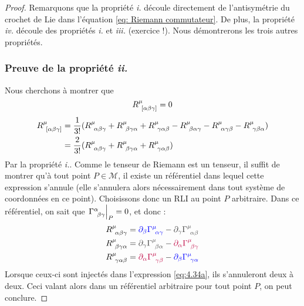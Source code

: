 \begin{proof}
    Remarquons que la propriété \emph{i.} découle directement de l'antisymétrie du crochet de Lie dans l'équation \ref{eq: Riemann commutateur}. De plus, la propriété \emph{iv.} découle des propriétés \emph{i.} et \emph{iii.} (exercice !). Nous démontrerons les trois autres propriétés.
    \subsubsection{Preuve de la propriété \emph{ii.}}
        Nous cherchons à montrer que 
        \begin{equation*}
            R\indices{^{\mu}_{\![\alpha \beta \gamma]}} = 0
        \end{equation*}
        \begin{align}
            R\indices{^{\mu}_{\![\alpha \beta \gamma]}} &= \frac{1}{3!}(R\indices{^{\mu}_{\!\alpha \beta \gamma}} + R\indices{^{\mu}_{\!\beta \gamma \alpha }} + R\indices{^{\mu}_{\!\gamma \alpha \beta}} - R\indices{^{\mu}_{\!\beta \alpha \gamma }} - R\indices{^{\mu}_{\!\alpha \gamma \beta} }- R\indices{^{\mu}_{\! \gamma \beta \alpha}})\\
            \label{eq:4.34a}
            &= \frac{2}{3!}(R\indices{^{\mu}_{\!\alpha \beta \gamma}} + R\indices{^{\mu}_{\!\beta \gamma \alpha}} + R\indices{^{\mu}_{\!\gamma \alpha \beta}})
        \end{align}
        Par la propriété \emph{i.}. Comme le tenseur de Riemann est un tenseur, il suffit de montrer qu'à tout point $P\in \mathcal{M}$, il existe un référentiel dans lequel cette expression s'annule (elle s'annulera alors nécessairement dans tout système de coordonnées en ce point). Choisissons donc un RLI au point $P$ arbitraire. Dans ce référentiel, on sait que $\atP{\Gamma\indices{^{\alpha}_{\!\beta \gamma}}} =0$, et donc :
        \begin{align}
        \nonumber
            &R\indices{^{\mu}_{\!\alpha \beta \gamma}}= \textcolor{blue}{\partial_{\beta}\Gamma\indices{^{\mu}_{\!\alpha \gamma}}} - \textcolor{darkgray}{\partial_{\gamma}\Gamma\indices{^{\mu}_{\!\alpha \beta}}}\\
            &R\indices{^{\mu}_{\!\beta \gamma \alpha}}= \textcolor{darkgray}{\partial_{\gamma}\Gamma\indices{^{\mu}_{\!\beta \alpha }}} - \textcolor{purple}{\partial_{\alpha}\Gamma\indices{^{\mu}_{\!\beta \gamma}}}\\
            \nonumber
            &R\indices{^{\mu}_{\!\gamma \alpha \beta}} =\textcolor{purple}{\partial_{\alpha}\Gamma\indices{^{\mu}_{\!\gamma \beta}}} - \textcolor{blue}{\partial_{\beta}\Gamma\indices{^{\mu}_{\! \gamma \alpha}}}
        \end{align}
        Lorsque ceux-ci sont injectés dans l'expression \ref{eq:4.34a}, ils s'annuleront deux à deux. Ceci valant alors dans un référentiel arbitraire pour tout point $P$, on peut conclure.

\end{proof}
